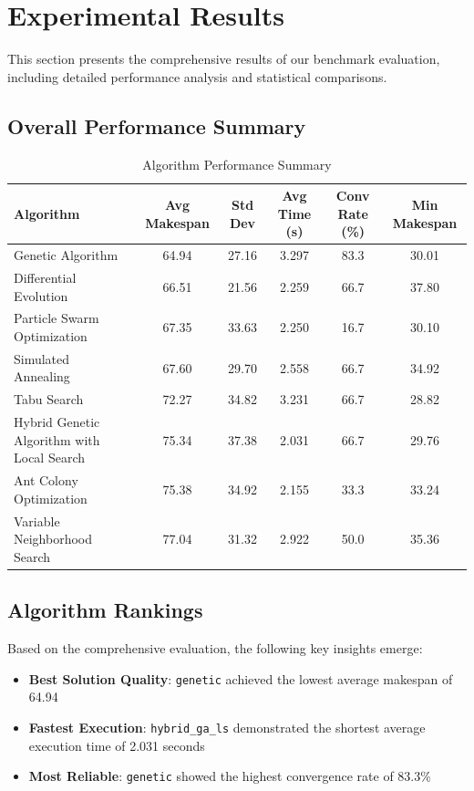 \documentclass[11pt,a4paper]{article}
\newcommand{\algorithm}[1]{\texttt{#1}}
\begin{document}
\section{Experimental Results}

This section presents the comprehensive results of our benchmark evaluation, including detailed performance analysis and statistical comparisons.

\subsection{Overall Performance Summary}


\begin{table}[H]
\centering
\caption{Algorithm Performance Summary}
\label{tab:performance}
\begin{tabular}{lccccc}
\toprule
Algorithm & Avg Makespan & Std Dev & Avg Time (s) & Conv Rate (\%) & Min Makespan \\
\midrule
Genetic Algorithm & 64.94 & 27.16 & 3.297 & 83.3 & 30.01 \\
Differential Evolution & 66.51 & 21.56 & 2.259 & 66.7 & 37.80 \\
Particle Swarm Optimization & 67.35 & 33.63 & 2.250 & 16.7 & 30.10 \\
Simulated Annealing & 67.60 & 29.70 & 2.558 & 66.7 & 34.92 \\
Tabu Search & 72.27 & 34.82 & 3.231 & 66.7 & 28.82 \\
Hybrid Genetic Algorithm with Local Search & 75.34 & 37.38 & 2.031 & 66.7 & 29.76 \\
Ant Colony Optimization & 75.38 & 34.92 & 2.155 & 33.3 & 33.24 \\
Variable Neighborhood Search & 77.04 & 31.32 & 2.922 & 50.0 & 35.36 \\

\bottomrule
\end{tabular}
\end{table}




\subsection{Algorithm Rankings}

Based on the comprehensive evaluation, the following key insights emerge:

\begin{itemize}
    \item \textbf{Best Solution Quality}: \algorithm{genetic} achieved the lowest average makespan of 64.94
    \item \textbf{Fastest Execution}: \algorithm{hybrid_ga_ls} demonstrated the shortest average execution time of 2.031 seconds
    \item \textbf{Most Reliable}: \algorithm{genetic} showed the highest convergence rate of 83.3\%
\end{itemize}
\end{document}
